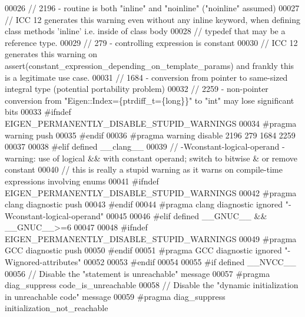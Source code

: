 \begin{DoxyCode}
00026   \textcolor{comment}{// 2196 - routine is both "inline" and "noinline" ("noinline" assumed)}
00027   \textcolor{comment}{//        ICC 12 generates this warning even without any inline keyword, when defining class methods
       'inline' i.e. inside of class body}
00028   \textcolor{comment}{//        typedef that may be a reference type.}
00029   \textcolor{comment}{// 279  - controlling expression is constant}
00030   \textcolor{comment}{//        ICC 12 generates this warning on assert(constant\_expression\_depending\_on\_template\_params) and
       frankly this is a legitimate use case.}
00031   \textcolor{comment}{// 1684 - conversion from pointer to same-sized integral type (potential portability problem)}
00032   \textcolor{comment}{// 2259 - non-pointer conversion from "Eigen::Index=\{ptrdiff\_t=\{long\}\}" to "int" may lose significant
       bits}
00033 \textcolor{preprocessor}{  #ifndef EIGEN\_PERMANENTLY\_DISABLE\_STUPID\_WARNINGS}
00034 \textcolor{preprocessor}{    #pragma warning push}
00035 \textcolor{preprocessor}{  #endif}
00036 \textcolor{preprocessor}{  #pragma warning disable 2196 279 1684 2259}
00037 
00038 \textcolor{preprocessor}{#elif defined \_\_clang\_\_}
00039   \textcolor{comment}{// -Wconstant-logical-operand - warning: use of logical && with constant operand; switch to bitwise & or
       remove constant}
00040   \textcolor{comment}{//     this is really a stupid warning as it warns on compile-time expressions involving enums}
00041 \textcolor{preprocessor}{  #ifndef EIGEN\_PERMANENTLY\_DISABLE\_STUPID\_WARNINGS}
00042 \textcolor{preprocessor}{    #pragma clang diagnostic push}
00043 \textcolor{preprocessor}{  #endif}
00044 \textcolor{preprocessor}{  #pragma clang diagnostic ignored "-Wconstant-logical-operand"}
00045 
00046 \textcolor{preprocessor}{#elif defined \_\_GNUC\_\_ && \_\_GNUC\_\_>=6}
00047 
00048 \textcolor{preprocessor}{  #ifndef EIGEN\_PERMANENTLY\_DISABLE\_STUPID\_WARNINGS}
00049 \textcolor{preprocessor}{    #pragma GCC diagnostic push}
00050 \textcolor{preprocessor}{  #endif}
00051 \textcolor{preprocessor}{  #pragma GCC diagnostic ignored "-Wignored-attributes"}
00052 
00053 \textcolor{preprocessor}{#endif}
00054 
00055 \textcolor{preprocessor}{#if defined \_\_NVCC\_\_}
00056   \textcolor{comment}{// Disable the "statement is unreachable" message}
00057 \textcolor{preprocessor}{  #pragma diag\_suppress code\_is\_unreachable}
00058   \textcolor{comment}{// Disable the "dynamic initialization in unreachable code" message}
00059 \textcolor{preprocessor}{  #pragma diag\_suppress initialization\_not\_reachable}

\end{DoxyCode}
